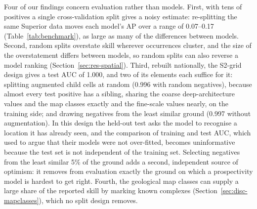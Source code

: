 \documentclass[pdflatex,sn-apa]{sn-jnl}
\begin{document}
Four of our findings concern evaluation rather than models. First, with tens of positives a single cross-validation split gives a noisy estimate: re-splitting the same Superior data moves each model's AP over a range of 0.07--0.17 (Table~\ref{tab:benchmark}), as large as many of the differences between models. Second, random splits overstate skill wherever occurrences cluster, and the size of the overstatement differs between models, so random splits can also reverse a model ranking (Section~\ref{sec:res-spatial}). Third, rebuilt nationally, the S2-grid design gives a test AUC of 1.000, and two of its elements each suffice for it: splitting augmented child cells at random (0.996 with random negatives), because almost every test positive has a sibling, sharing the coarse deep-architecture values and the map classes exactly and the fine-scale values nearly, on the training side; and drawing negatives from the least similar ground (0.997 without augmentation). In this design the held-out test asks the model to recognise a location it has already seen, and the comparison of training and test AUC, which \citet{Parsa2024} used to argue that their models were not over-fitted, becomes uninformative because the test set is not independent of the training set. Selecting negatives from the least similar 5\% of the ground adds a second, independent source of optimism: it removes from evaluation exactly the ground on which a prospectivity model is hardest to get right. Fourth, the geological map classes can supply a large share of the reported skill by marking known complexes (Section~\ref{sec:disc-mapclasses}), which no split design removes.
\end{document}

